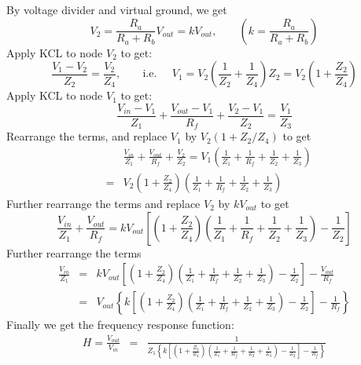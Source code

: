 \documentclass{article}
\begin{document}
\begin{itemize}
  By voltage divider and virtual ground, we get
  \begin{equation}
  V_2=\frac{R_a}{R_a+R_b}V_{out}=kV_{out},\;\;\;\;\;\;\;\left(k=\frac{R_a}{R_a+R_b}\right)
  \end{equation}
  Apply KCL to node $V_2$ to get:
  \begin{equation}
  \frac{V_1-V_2}{Z_2}=\frac{V_2}{Z_4},\;\;\;\;\;\;\;\mbox{i.e.}\;\;\;\;\;
  V_1=V_2\left(\frac{1}{Z_2}+\frac{1}{Z_4}\right)Z_2
  =V_2\left(1+\frac{Z_2}{Z_4}\right)
  \end{equation}
  Apply KCL to node $V_1$ to get:
  \begin{equation}
  \frac{V_{in}-V_1}{Z_1}+\frac{V_{out}-V_1}{R_f}+\frac{V_2-V_1}{Z_2}
  =\frac{V_1}{Z_3}
  \end{equation}
  Rearrange the terms, and replace $V_1$ by $V_2(1+Z_2/Z_4)$ to get
  \begin{eqnarray}
    &&\frac{V_{in}}{Z_1}+\frac{V_{out}}{R_f}+\frac{V_2}{Z_2}
    =V_1\left(\frac{1}{Z_1}+\frac{1}{R_f}+\frac{1}{Z_2}+\frac{1}{Z_3}\right)
    \nonumber\\
    &=&V_2\left(1+\frac{Z_2}{Z_4}\right)\left(\frac{1}{Z_1}
    +\frac{1}{R_f}+\frac{1}{Z_2}+\frac{1}{Z_3}\right)
  \end{eqnarray}
  Further rearrange the terms and replace $V_2$ by $kV_{out}$ to get
  \begin{equation}
  \frac{V_{in}}{Z_1}+\frac{V_{out}}{R_f}
  =kV_{out}\left[\left(1+\frac{Z_2}{Z_4}\right)\left(\frac{1}{Z_1}+\frac{1}{R_f}
    +\frac{1}{Z_2}+\frac{1}{Z_3}\right)-\frac{1}{Z_2}\right]
  \end{equation}
  Further rearrange the terms
  \begin{eqnarray}
    \frac{V_{in}}{Z_1}&=&kV_{out}\left[\left(1+\frac{Z_2}{Z_4}\right)
\left(\frac{1}{Z_1}
      +\frac{1}{R_f}+\frac{1}{Z_2}+\frac{1}{Z_3}\right)-\frac{1}{Z_2}\right]-\frac{V_{out}}{R_f}
    \nonumber \\
    &=&
    V_{out}\left\{k\left[\left(1+\frac{Z_2}{Z_4}\right)\left(\frac{1}{Z_1}
      +\frac{1}{R_f}+\frac{1}{Z_2}+\frac{1}{Z_3}\right)-\frac{1}{Z_2}\right]-\frac{1}{R_f}\right\}
  \end{eqnarray}
  Finally we get the frequency response function:
  \begin{eqnarray}
    H=\frac{V_{out}}{V_{in}}&=&
    \frac{1}{Z_1\left\{k\left[\left(1+\frac{Z_2}{Z_4}\right)\left(\frac{1}{Z_1}+\frac{1}{R_f}+\frac{1}{Z_2}+\frac{1}{Z_3}\right)-\frac{1}{Z_2}\right]-\frac{1}{R_f}\right\}}
    \nonumber \\

\end{eqnarray}
\end{itemize}
\end{document}
